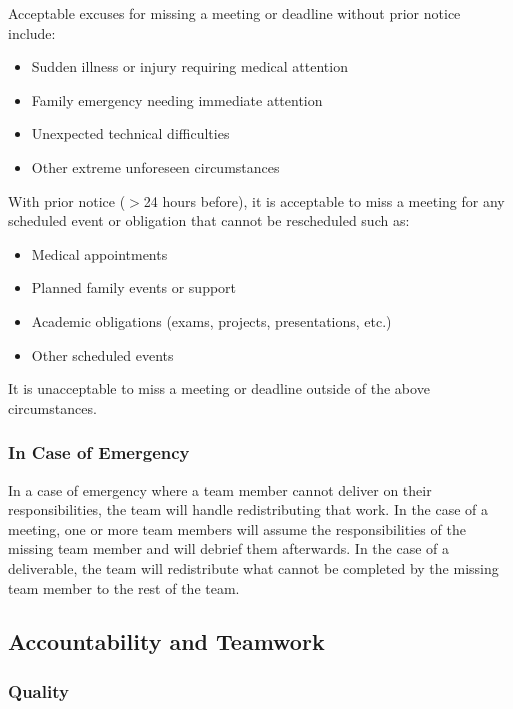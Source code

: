 \documentclass{article}
\begin{document}
\noindent Acceptable excuses for missing a meeting or deadline without prior notice include:
\begin{itemize}
  \item Sudden illness or injury requiring medical attention
  \item Family emergency needing immediate attention
  \item Unexpected technical difficulties
  \item Other extreme unforeseen circumstances
\end{itemize}

\noindent With prior notice ($>$24 hours before), it is acceptable to miss a meeting for any scheduled event or obligation that cannot be rescheduled such as:
\begin{itemize}
  \item Medical appointments
  \item Planned family events or support
  \item Academic obligations (exams, projects, presentations, etc.)
  \item Other scheduled events
\end{itemize}

\noindent It is unacceptable to miss a meeting or deadline outside of the above circumstances.

\subsubsection*{In Case of Emergency}


\noindent In a case of emergency where a team member cannot deliver on their responsibilities, the team will handle redistributing that work.
In the case of a meeting, one or more team members will assume the responsibilities of the missing team member and will debrief them afterwards.
In the case of a deliverable, the team will redistribute what cannot be completed by the missing team member to the rest of the team.

\subsection*{Accountability and Teamwork}

\subsubsection*{Quality} 
\end{document}
